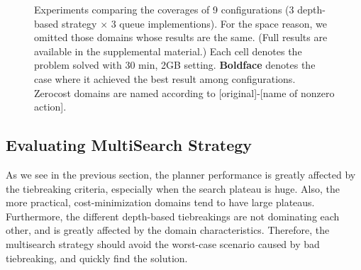 

\begin{figure}[htb]
 \centering
 
 \caption{Experiments
 comparing the coverages of 9 configurations (3 depth-based strategy
 $\times$ 3 queue implementions). For the space reason, we omitted those
 domains whose results are the same. (Full results are available in the
 supplemental material.) Each cell denotes the problem solved with 30
 min, 2GB setting. \textbf{Boldface} denotes the case where it achieved
 the best result among configurations. Zerocost domains are named
 according to [original]-[name of nonzero action].}
 \label{depth}
\end{figure}

%  

\subsection{Evaluating MultiSearch Strategy}

As we see in the previous section, the planner performance is greatly
affected by the tiebreaking criteria, especially when the search plateau
is huge.
% 
Also, the more practical, cost-minimization domains tend to have large plateaus.
% 
Furthermore, the different depth-based tiebreakings are not dominating
each other, and is greatly affected by the domain characteristics.
% 
Therefore, the multisearch strategy should avoid the
worst-case scenario caused by bad tiebreaking, and quickly find the solution.

